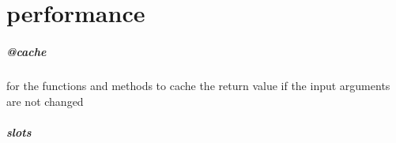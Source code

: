 \chapter{performance}
\paragraph{@cache}
    for the functions and methods to cache the return value if the input arguments are not changed
        
\paragraph{slots}